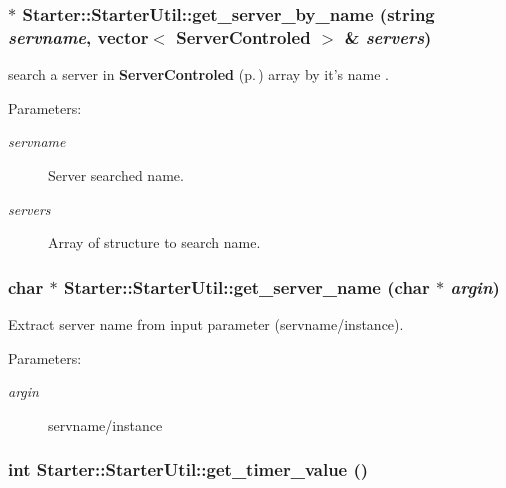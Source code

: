 \subsubsection{ $\ast$ Starter::Starter\-Util::get\_\-server\_\-by\_\-name (string {\em servname}, vector$<$ {\bf Server\-Controled} $>$ \& {\em servers})}\label{classStarter_1_1StarterUtil_z8_6}


search a server in {\bf Server\-Controled} {\rm (p.\,\pageref{structStarter_1_1ServerControled})} array by it's name .

\begin{Desc}
\item[Parameters: ]\par
\begin{description}
\item[{\em 
servname}]Server searched name. \item[{\em 
servers}]Array of structure to search name. \end{description}
\end{Desc}
\subsubsection{\setlength{\rightskip}{0pt plus 5cm}char $\ast$ Starter::Starter\-Util::get\_\-server\_\-name (char $\ast$ {\em argin})}\label{classStarter_1_1StarterUtil_z8_0}


Extract server name from input parameter (servname/instance).

\begin{Desc}
\item[Parameters: ]\par
\begin{description}
\item[{\em 
argin}]servname/instance \end{description}
\end{Desc}
\subsubsection{\setlength{\rightskip}{0pt plus 5cm}int Starter::Starter\-Util::get\_\-timer\_\-value ()}\label{classStarter_1_1StarterUtil_z8_10}


